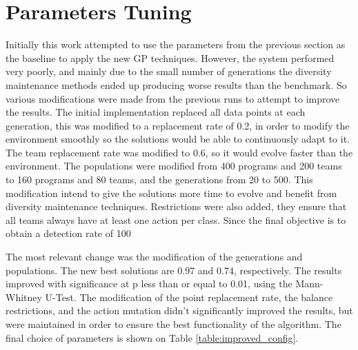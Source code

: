 \documentclass[journal]{IEEEtran}
\begin{document}
\section{Parameters Tuning}
Initially this work attempted to use the parameters from the previous section as the baseline to apply the new GP techniques. However, the system performed very poorly, and mainly due to the small number of generations the diversity maintenance methods ended up producing worse results than the benchmark. So various modifications were made from the previous runs to attempt to improve the results. The initial implementation replaced all data points at each generation, this was modified to a replacement rate of 0.2, in order to modify the environment smoothly so the solutions would be able to continuously adapt to it. The team replacement rate was modified to 0.6, so it would evolve faster than the environment. The populations were modified from 400 programs and 200 teams to 160 programs and 80 teams, and the generations from 20 to 500. This modification intend to give the solutions more time to evolve and benefit from diversity maintenance techniques. Restrictions were also added, they ensure that all teams always have at least one action per class. Since the final objective is to obtain a detection rate of 100%

The most relevant change was the modification of the generations and populations. The new best solutions are 0.97 and 0.74, respectively. The results improved with significance at p less than or equal to 0.01, using the Mann-Whitney U-Test. The modification of the point replacement rate, the balance restrictions, and the action mutation didn't significantly improved the results, but were maintained in order to ensure the best functionality of the algorithm. The final choice of parameters is shown on Table \ref{table:improved_config}.
\end{document}
